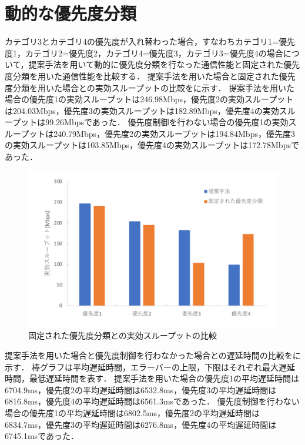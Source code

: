 \documentclass[a4paper,11pt,uplatex]{ujreport}
\begin{document}
\section{動的な優先度分類}
\label{sec:動的な優先度分類}

  カテゴリ3とカテゴリ4の優先度が入れ替わった場合，すなわちカテゴリ1=優先度1，カテゴリ2=優先度2，カテゴリ4=優先度3，カテゴリ3=優先度4の場合について，提案手法を用いて動的に優先度分類を行なった通信性能と固定された優先度分類を用いた通信性能を比較する．
  提案手法を用いた場合と固定された優先度分類を用いた場合との実効スループットの比較をに示す．
  提案手法を用いた場合の優先度1の実効スループットは246.98Mbps，優先度2の実効スループットは204.03Mbps，優先度3の実効スループットは182.89Mbps，優先度4の実効スループットは99.26Mbpsであった．
  優先度制御を行わない場合の優先度1の実効スループットは240.79Mbps，優先度2の実効スループットは194.84Mbps，優先度3の実効スループットは103.85Mbps，優先度4の実効スループットは172.78Mbpsであった．

  \begin{figure}[!b]
    \centering
    \includegraphics[width=0.85\linewidth]{img/throughput_2.pdf}
    \caption{固定された優先度分類との実効スループットの比較}
    \label{fig:throughput_2}
  \end{figure}

  提案手法を用いた場合と優先度制御を行わなかった場合との遅延時間の比較をに示す．
  棒グラフは平均遅延時間，エラーバーの上限，下限はそれぞれ最大遅延時間，最低遅延時間を表す．
  提案手法を用いた場合の優先度1の平均遅延時間は6704.9ms，優先度2の平均遅延時間は6532.8ms，優先度3の平均遅延時間は6816.8ms，優先度4の平均遅延時間は6561.3msであった．
  優先度制御を行わない場合の優先度1の平均遅延時間は6802.5ms，優先度2の平均遅延時間は6834.7ms，優先度3の平均遅延時間は6276.8ms，優先度4の平均遅延時間は6745.1msであった．
\end{document}
